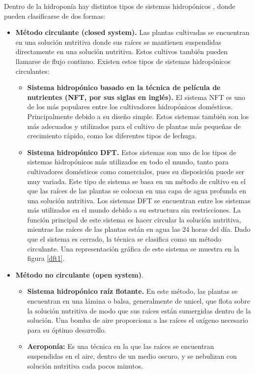 Dentro de la hidroponía hay distintos tipos de sistemas hidropónicos \cite{dholwani2018introduction}, donde pueden clasificarse de dos formas:
\begin{itemize}
\item \textbf{Método circulante (closed system).} Las plantas cultivadas se encuentran en una solución nutritiva donde sus raíces se mantienen suspendidas directamente en una solución nutritiva. Estos cultivos también pueden llamarse de flujo continuo. Existen estos tipos de sistemas hidropónicos circulantes:
\newpage
\begin{itemize}
\item \textbf{Sistema hidropónico basado en la técnica de película de nutrientes (NFT, por sus siglas en inglés).} El sistema NFT es uno de los más populares entre los cultivadores hidropónicos domésticos. Principalmente debido a su diseño simple. Estos sistemas también son los más adecuados y utilizados para el cultivo de plantas más pequeñas de crecimiento rápido, como los diferentes tipos de lechuga.

\item \textbf{Sistema hidropónico DFT.} Estos sistemas son uno de los tipos de sistemas hidropónicos más utilizados en todo el mundo, tanto para cultivadores domésticos como comerciales, pues su disposición puede ser muy variada. Este tipo de sistema se basa en un método de cultivo en el que las raíces de las plantas se colocan en una capa de agua profunda en una solución nutritiva. Los sistemas DFT se encuentran entre los sistemas más utilizados en el mundo debido a su estructura sin restricciones. La función principal de este sistema es hacer circular la solución nutritiva, mientras las raíces de las plantas están en agua las 24 horas del día. Dado que el sistema es cerrado, la técnica se clasifica como un método circulante. Una representación gráfica de este sistema se muestra en la figura \ref{dft1}.
\end{itemize}

\item \textbf{Método no circulante (open system)}.
\begin{itemize}
\item \textbf{Sistema hidropónico raíz flotante.} En este método, las plantas se encuentran en una lámina o balsa, generalmente de unicel, que flota sobre la solución nutritiva de modo que sus raíces están sumergidas dentro de la solución. Una bomba de aire proporciona a las raíces el oxígeno necesario para su óptimo desarrollo. 
\item \textbf{Aeroponía:} Es una técnica en la que las raíces se encuentran suspendidas en el aire, dentro de un medio oscuro, y se nebulizan con solución nutritiva cada pocos minutos.
\end{itemize}
\end{itemize}

